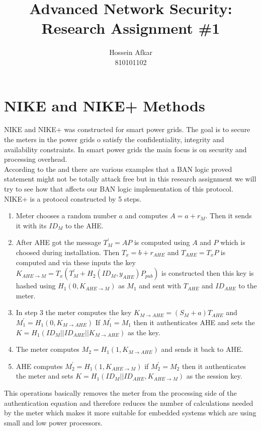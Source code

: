 \documentclass[a4paper, 11pt]{article}
\title{Advanced Network Security: Research Assignment \#1}
\author{Hossein Afkar \\ 810101102}
\begin{document}
\maketitle
\section{NIKE and NIKE+ Methods}
NIKE and NIKE+ was constructed for smart power grids. The goal is to 
secure the meters in the power grids o satisfy the confidentiality, integrity
and availability constraints. In smart power grids the main focus is on
security and processing overhead. \\
According to the \cite{boyd1993limitation} and \cite{nessett1990critique}
there are various examples that a BAN logic proved statement might not
be totally attack free but in this research assignment we will try to
see how that affects our BAN logic implementation of this protocol.
NIKE+ is a protocol constructed by 5 steps.
\begin{enumerate}
    \item Meter chooses a random number $a$ and computes $A = a + r_{M}$.
        Then it sends it with its $ID_M$ to the AHE.
    \item After AHE got the message $T^{\prime}_M = AP$ is computed using $A$
        and $P$ which is choosed during installation. Then $T_x = b + r_{AHE}$
        and $T_{AHE} = T_xP$ is computed and via these inputs the key
        $K_{AHE \rightarrow M} = T_x(T^{\prime}_M + H_2(ID_M, y_{AHE})P_{pub})$
        is constructed then this key is hashed using
        $H_1(0, K_{AHE \rightarrow M})$ as $M_1$ and sent with $T_{AHE}$ and $ID_{AHE}$
        to the meter.
    \item In step 3 the meter computes the key
        $K_{M \rightarrow AHE} = (S_M + a)T_{AHE}$ and
        $M^{\prime}_1 = H_1(0, K_{M \rightarrow AHE})$ If $M^{\prime}_1 = M_1$
        then it authenticates AHE and sets the $K = H_1(ID_M || ID_{AHE} || K_{M \rightarrow AHE})$
        as the key.
    \item The meter computes $M_2 = H_1(1, K_{M \rightarrow AHE})$ and sends it
        back to AHE.
    \item AHE computes $M^{\prime}_2 = H_1(1, K_{AHE \rightarrow M})$
        if $M^{\prime}_2 = M_2$ then it authenticates the meter and sets 
        $K = H_1(ID_M || ID_{AHE}, K_{AHE \rightarrow M})$ as the session key.
\end{enumerate}
This operations basically removes the meter from the processing side of
the authentication equation
and therefore reduces the number of calculations needed by the meter which 
makes it more suitable for embedded systems which are using small and 
low power processors.
\end{document}
